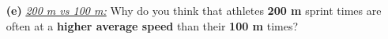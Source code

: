 \documentclass[A4,12pt]{article}
\begin{document}
\begin{enumerate}[label=\bfseries (\arabic*)]
\begin{itemize}
    \item[\bf (e)] \href{https://isaacphysics.org/questions/olympic_sprinter?board=aa9cd909-45d0-45da-921f-d2435c9b3afc}{\it 200  m vs 100 m:} Why do you think that athletes \textbf{200 m} sprint times are often at a \textbf{higher average speed} than their \textbf{100 m} times?
\end{itemize}



































\end{enumerate}
\end{document}
